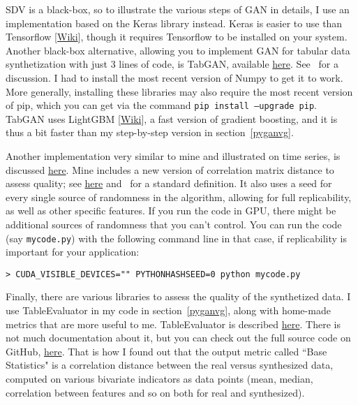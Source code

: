 \documentclass[oneside,10pt]{book}
\begin{document}
SDV is a black-box, so to illustrate the various steps of GAN in details, I use an 
implementation based on the Keras library instead.  Keras is easier to use than \textcolor{index}{Tensorflow} 
[\href{https://en.wikipedia.org/wiki/TensorFlow}{Wiki}], though it requires Tensorflow to be installed on your system. Another black-box alternative, allowing you to implement GAN for tabular data synthetization with just 3 lines of code, is 
\textcolor{index}{TabGAN}, available \href{https://github.com/Diyago/GAN-for-tabular-data}{here}. See~\cite{insaf2020}  for a discussion. 
I had to install the most recent version of Numpy to get it to work.  More generally, installing these libraries may also require 
 the most recent version of pip, which you can get via the command \texttt{pip install --upgrade pip}. TabGAN uses 
\textcolor{index}{LightGBM} [\href{https://en.wikipedia.org/wiki/LightGBM}{Wiki}], 
 a fast version of gradient boosting, and it is thus a bit faster than my step-by-step version in section~\ref{pyganvg}.

Another implementation very similar to mine  and illustrated on time series, is 
discussed \href{https://towardsdatascience.com/hands-on-generative-adversarial-networks-gan-for-signal-processing-with-python-ff5b8d78bd28}{here}. Mine includes a new version of \textcolor{index}{correlation matrix distance} to assess quality; 
see \href{https://www.researchgate.net/publication/4194743_Correlation_Matrix_Distance_a_Meaningful_Measure_for_Evaluation_of_Non-Stationary_MIMO_Channels}{here} and~\cite{pcdxzaw} for a standard definition.
It also uses a seed for every single source of randomness in the algorithm, allowing for full replicability, as well as other specific features. If you run the code in GPU, there
 might be additional sources of randomness that you can't control. You can run the code (say \texttt{mycode.py}) with the following command line in that case, if replicability is important for your application:

 \texttt{> CUDA\_VISIBLE\_DEVICES="" PYTHONHASHSEED=0 python mycode.py}

\noindent Finally, there are various libraries to assess the quality of the synthetized data. I use TableEvaluator in my code
 in section~\ref{pyganvg}, along
 with home-made metrics that are more useful to me. TableEvaluator is described \href{https://pypi.org/project/table-evaluator/}{here}. There is not much documentation about it, but you can check out the full source code on GitHub, \href{https://github.com/Baukebrenninkmeijer/table-evaluator/blob/master/table_evaluator/table_evaluator.py}{here}. That is how I found out that the output metric  called 
``Base Statistics" is a correlation distance between the real versus synthesized data, computed on various bivariate indicators as data points (mean, median, correlation between features and so on both for real and synthesized). 
\end{document}
